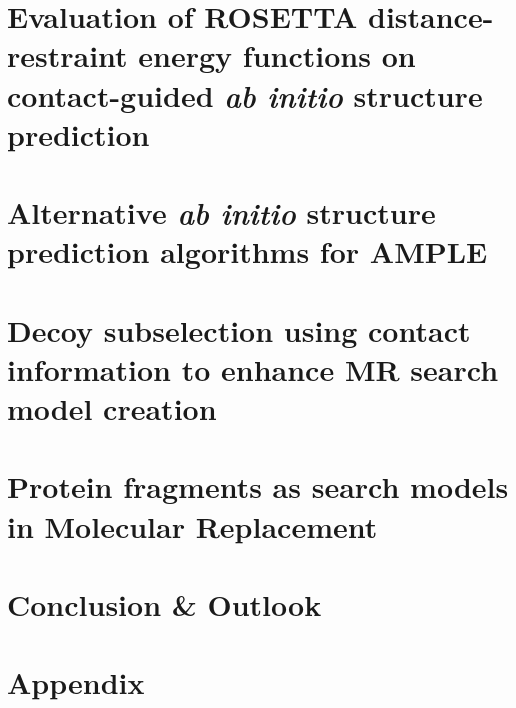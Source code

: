 \documentclass[11pt,twoside,reqno,openright]{report}
\begin{document}
\chapter{Evaluation of ROSETTA distance-restraint energy functions on contact-guided \textit{ab initio} structure prediction} \label{chap:rosetta_energy_functions}
\clearpage
% 

\chapter{Alternative \textit{ab initio} structure prediction algorithms for AMPLE} \label{chap:alternate_abinitio_protocols}
\clearpage
% 

\chapter{Decoy subselection using contact information to enhance MR search model creation} \label{chap:ample_decoys}
\clearpage
% 

\chapter{Protein fragments as search models in Molecular Replacement} \label{chap:ample_flib}
\clearpage
% 

\chapter{Conclusion \& Outlook}
\clearpage
% 

\appendix
\chapter{Appendix}
\clearpage
% 

\printbibliography[heading=bibintoc]
\end{document}
